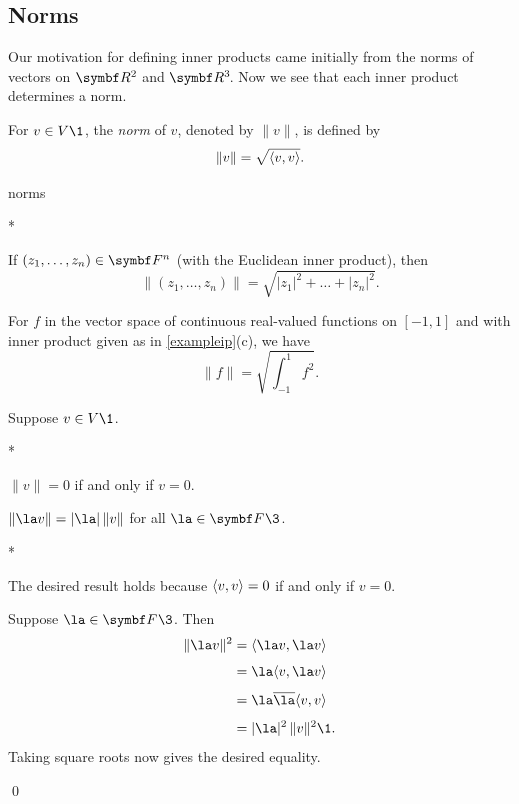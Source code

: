\pagebreak[3]

\subsection{Norms}

Our motivation for defining inner products came initially from the norms of vectors on $\R2$ and $\RR3$. Now we see that each inner product determines a norm.

{For $v \in V\1$, the \emph{norm} of $v$, denoted by $\|v\|$, is defined by
\[
\|v\| = \sqrt{\langle v,v\rangle}.
\]}

\begin{example}{norms}
\begin{subtheorem}*
\item
If $(z_1, \dots, z_n) \in \F{n}$ (with the Euclidean inner
product), then
\[
\|(z_1, \dots, z_n)\| = \sqrt{|z_1|^2 + \dots + |z_n|^2}.
\]

\item
For $f$ in the vector space of continuous real-valued functions on $[-1,1]$ and with inner product given as in \ref{exampleip}(c), we have
\[
\|f\| =  \sqrt{\int_{-1}^1 f^2}.
\]
\end{subtheorem}
\vspace{-6bp}
\end{example}

{Suppose $v \in V\1$.
\begin{subtheorem}*
\item
$\|v\| = 0$ if and only if $v = 0$.
\item
$\|\la v\| = |\la|\,\|v\|$ for all $\la \in \F{}\3$.
\end{subtheorem}}

\proof
\begin{subtheorem}*
\item
The desired result holds because $\langle v,v\rangle = 0$ if and only if $v = 0$.

\item
Suppose $\la \in \F{}\3$. Then
\begin{align*}
\|\la v\|^2 &= \ip{\la v, \la v} \\[4bp]
&= \la \ip{v, \la v} \\[4bp]
&= \la \bar{\la}\ip{v, v} \\[4bp]
&= |\la|^2 \, \|v\|^2\1.
\end{align*}
Taking square roots now gives the desired equality.
\end{subtheorem}
\qed

